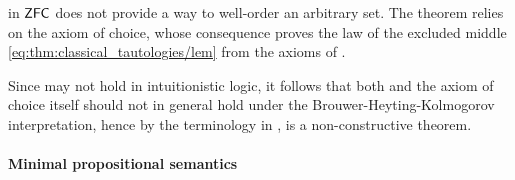 \begin{example}\label{ex:con:brouwer_heyting_kolmogorov_interpretation/well_ordering_principle_zfc}
   in \hyperref[def:zfc]{\( \textsf{ZFC} \)} does not provide a way to well-order an arbitrary set. The theorem relies on the axiom of choice, whose consequence  proves the law of the excluded middle \eqref{eq:thm:classical_tautologies/lem} from the axioms of .

  Since  may not hold in intuitionistic logic, it follows that both  and the axiom of choice itself should not in general hold under the Brouwer-Heyting-Kolmogorov interpretation, hence by the terminology in ,  is a non-constructive theorem.
\end{example}

\paragraph{Minimal propositional semantics}

